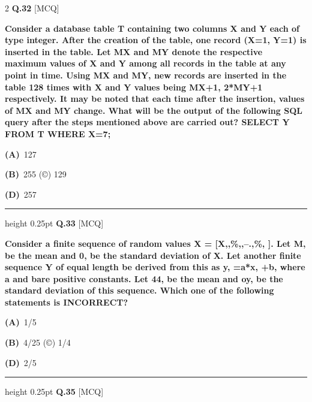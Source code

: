 \documentclass[a4paper,10pt,twoside]{article}
\begin{document}
\begin{multicols}{2}
\noindent\textbf{Q.32} \hfill {\footnotesize\textsf{[MCQ]}}
\par\vspace{2pt}
{\bfseries Consider a database table T containing two columns X and Y each of type integer. After the
creation of the table, one record (X=1, Y=1) is inserted in the table.
Let MX and MY denote the respective maximum values of X and Y among all records in the table
at any point in time. Using MX and MY, new records are inserted in the table 128 times with X and
Y values being MX+1, 2*MY+1 respectively. It may be noted that each time after the insertion,
values of MX and MY change.
What will be the output of the following SQL query after the steps mentioned above are carried
out?
SELECT Y FROM T WHERE X=7; \par}
\par\vspace{2pt}\noindent
\textbf{(A)}~127\par\vspace{2pt}\noindent
\textbf{(B)}~255 (©) 129\par\vspace{2pt}\noindent
\textbf{(D)}~257
\par\vspace{6pt}\hrule height 0.25pt\vspace{6pt}
\noindent\textbf{Q.33} \hfill {\footnotesize\textsf{[MCQ]}}
\par\vspace{2pt}
{\bfseries Consider a finite sequence of random values X = [X,,\%,,--.,\%, ]. Let M, be the mean and 0, be
the standard deviation of X. Let another finite sequence Y of equal length be derived from this
as y, =a*x, +b, where a and bare positive constants. Let 44, be the mean and oy, be the standard
deviation of this sequence. Which one of the following statements is INCORRECT? \par}
\par\vspace{2pt}\noindent
\textbf{(A)}~1/5\par\vspace{2pt}\noindent
\textbf{(B)}~4/25 (©) 1/4\par\vspace{2pt}\noindent
\textbf{(D)}~2/5
\par\vspace{6pt}\hrule height 0.25pt\vspace{6pt}
\noindent\textbf{Q.35} \hfill {\footnotesize\textsf{[MCQ]}}
\par\vspace{2pt}

\end{multicols}
\end{document}
